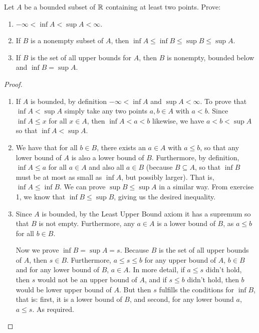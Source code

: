 \begin{exercise}{2}
Let $A$ be a bounded subset of $\mathbb{R}$ containing at least two points. Prove:
\begin{enumerate}
    \item $-\infty<\inf A<\sup A<\infty$.
    \item If $B$ is a nonempty subset of $A$, then $\inf A\leq\inf B\leq\sup B\leq\sup A$.
    \item If $B$ is the set of all upper bounds for $A$, then $B$ is nonempty, bounded below and $\inf B=\sup A$.
\end{enumerate}
\end{exercise}
\begin{proof}
\begin{enumerate}
    \item If $A$ is bounded, by definition $-\infty<\inf A$ and $\sup A<\infty$. To prove that $\inf A<\sup A$ simply take any two points $a,b\in A$ with $a<b$. Since $\inf A\leq x$ for all $x\in A$, then $\inf A<a<b$ likewise, we have $a<b<\sup A$ so that $\inf A<\sup A$.
    \item We have that for all $b\in B$, there exists an $a\in A$ with $a\leq b$, so that any lower bound of $A$ is also a lower bound of $B$. Furthermore, by definition, $\inf A\leq a$ for all $a\in A$ and also all $a\in B$ (because $B\subseteq A$, so that $\inf B$ must be at most as small as $\inf A$, but possibly larger). That is, $\inf A\leq \inf B$. We can prove $\sup B\leq \sup A$ in a similar way. From exercise 1, we know that $\inf B\leq\sup B$, giving us the desired inequality.
    \item Since $A$ is bounded, by the Least Upper Bound axiom it has a supremum so that $B$ is not empty. Furthermore, any $a\in A$ is a lower bound of $B$, as $a\leq b$ for all $b\in B$. 
    
    Now we prove $\inf B=\sup A= s$. Because $B$ is the set of all upper bounds of $A$, then $s\in B$. Furthermore, $a\leq s\leq b$ for any upper bound of $A$, $b\in B$ and for any lower bound of $B$, $a\in A$. In more detail, if $a\leq s$ didn't hold, then $s$ would not be an upper bound of $A$, and if $s\leq b$ didn't hold, then $b$ would be lower upper bound of $A$. But then $s$ fulfills the conditions for $\inf B$, that is: first, it is a lower bound of $B$, and second, for any lower bound $a$, $a\leq s$. As required. 
\end{enumerate}
\end{proof}

